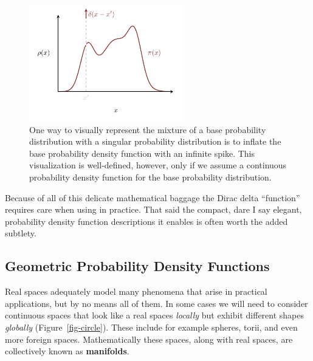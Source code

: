 \documentclass[
  letterpaper,
  DIV=11,
  numbers=noendperiod]{scrartcl}
\begin{document}
\begin{figure}

{\centering \includegraphics[width=0.6\textwidth,height=\textheight]{figures/singular_density/inflation/inflation.pdf}

}

\caption{\label{fig-inflation}One way to visually represent the mixture
of a base probability distribution with a singular probability
distribution is to inflate the base probability density function with an
infinite spike. This visualization is well-defined, however, only if we
assume a continuous probability density function for the base
probability distribution.}

\end{figure}

Because of all of this delicate mathematical baggage the Dirac delta
``function'' requires care when using in practice. That said the
compact, dare I say elegant, probability density function descriptions
it enables is often worth the added subtlety.

\hypertarget{geometric-probability-density-functions}{%
\subsection{Geometric Probability Density
Functions}\label{geometric-probability-density-functions}}

Real spaces adequately model many phenomena that arise in practical
applications, but by no means all of them. In some cases we will need to
consider continuous spaces that look like a real spaces \emph{locally}
but exhibit different shapes \emph{globally} (Figure~\ref{fig-circle}).
These include for example spheres, torii, and even more foreign spaces.
Mathematically these spaces, along with real spaces, are collectively
known as \textbf{manifolds}.
\end{document}
